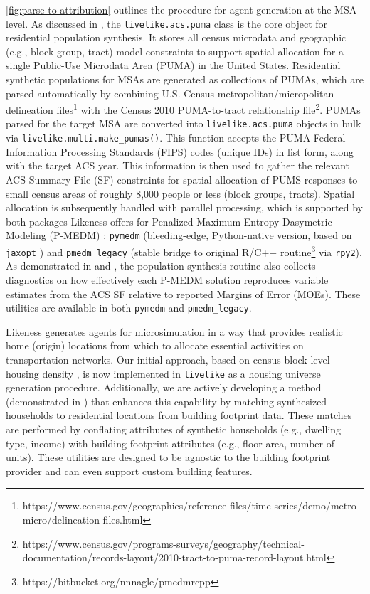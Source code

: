 \autoref{fig:parse-to-attribution} outlines the procedure for agent generation at the MSA level. As discussed in \cite{likeness-scipy-paper-2022}, the \texttt{livelike.acs.puma} class is the core object for residential population synthesis. It stores all census microdata and geographic (e.g., block group, tract) model constraints to support spatial allocation for a single Public-Use Microdata Area (PUMA) in the United States. Residential synthetic populations for MSAs are generated as collections of PUMAs, which are parsed automatically by combining U.S. Census metropolitan/micropolitan delineation files\footnote{https://www.census.gov/geographies/reference-files/time-series/demo/metro-micro/delineation-files.html} with the Census 2010 PUMA-to-tract relationship file\footnote{https://www.census.gov/programs-surveys/geography/technical-documentation/records-layout/2010-tract-to-puma-record-layout.html}. PUMAs parsed for the target MSA are converted into \texttt{livelike.acs.puma} objects in bulk via \texttt{livelike.multi.make\_pumas()}. This function accepts the PUMA Federal Information Processing Standards (FIPS) codes (unique IDs) in list form, along with the target ACS year. This information is then used to gather the relevant ACS Summary File (SF) constraints for spatial allocation of PUMS responses to small census areas of roughly 8,000 people or less (block groups, tracts). Spatial allocation is subsequently handled with parallel processing, which is supported by both packages Likeness offers for Penalized Maximum-Entropy Dasymetric Modeling (P-MEDM) \cite{nagle2014dasymetric}: \texttt{pymedm} (bleeding-edge, Python-native version, based on \texttt{jaxopt} \cite{jaxopt_implicit_diff}) and \texttt{pmedm\_legacy} (stable bridge to original R/C++ routine\footnote{https://bitbucket.org/nnnagle/pmedmrcpp} via \texttt{rpy2}). As demonstrated in \cite{likeness-scipy-paper-2022} and \cite{likeness-scipy-poster-2022}, the population synthesis routine also collects diagnostics on how effectively each P-MEDM solution reproduces variable estimates from the ACS SF relative to reported Margins of Error (MOEs). These utilities are available in both \texttt{pymedm} and \texttt{pmedm\_legacy}.

Likeness generates agents for microsimulation in a way that provides realistic home (origin) locations from which to allocate essential activities on transportation networks. Our initial approach, based on census block-level housing density \cite{likeness-scipy-paper-2022, likeness-scipy-poster-2022}, is now implemented in \texttt{livelike} as a housing universe generation procedure. Additionally, we are actively developing a method (demonstrated in ) that enhances this capability by matching synthesized households to residential locations from building footprint data.  These matches are performed by conflating attributes of synthetic households (e.g., dwelling type, income) with building footprint attributes (e.g., floor area, number of units). These utilities are designed to be agnostic to the building footprint provider and can even support
custom building features.

